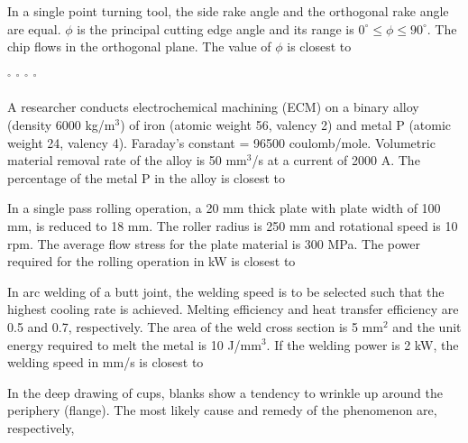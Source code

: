 \documentclass[addpoints,11pt]{exam}
\begin{document}
\begin{questions}
    \question In a single point turning tool, the side rake angle and the orthogonal rake angle are equal. $\phi$ is the principal cutting edge angle and its range is $0^\circ \le \phi \le 90^\circ$. The chip flows in the orthogonal plane. The value of $\phi$ is closest to

    \begin{oneparchoices}
        $^\circ$
        $^\circ$
        $^\circ$
        $^\circ$
    \end{oneparchoices}

    \question A researcher conducts electrochemical machining (ECM) on a binary alloy (density 6000 kg/m$^3$) of iron (atomic weight 56, valency 2) and metal P (atomic weight 24, valency 4). Faraday's constant = 96500 coulomb/mole. Volumetric material removal rate of the alloy is 50 mm$^3$/s at a current of 2000 A. The percentage of the metal P in the alloy is closest to

    \begin{oneparchoices}
    \end{oneparchoices}

    \question In a single pass rolling operation, a 20 mm thick plate with plate width of 100 mm, is reduced to 18 mm. The roller radius is 250 mm and rotational speed is 10 rpm. The average flow stress for the plate material is 300 MPa. The power required for the rolling operation in kW is closest to

    \begin{oneparchoices}
    \end{oneparchoices}

    \question In arc welding of a butt joint, the welding speed is to be selected such that the highest cooling rate is achieved. Melting efficiency and heat transfer efficiency are 0.5 and 0.7, respectively. The area of the weld cross section is 5 mm$^2$ and the unit energy required to melt the metal is 10 J/mm$^3$. If the welding power is 2 kW, the welding speed in mm/s is closest to

    \begin{oneparchoices}
    \end{oneparchoices}

    \question In the deep drawing of cups, blanks show a tendency to wrinkle up around the periphery (flange). The most likely cause and remedy of the phenomenon are, respectively,


\end{questions}
\end{document}
